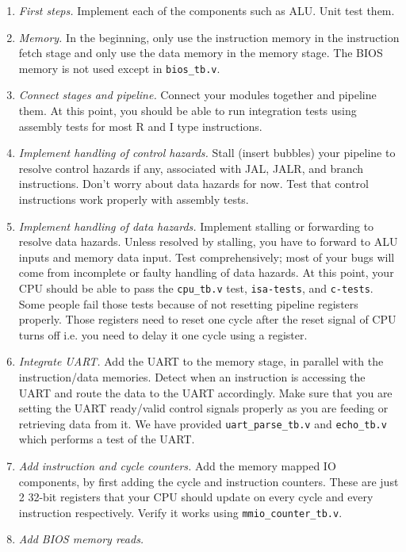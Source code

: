 \begin{enumerate}
\item \textit{First steps.}
  Implement each of the components such as ALU.
  Unit test them.
\item \textit{Memory.}
  In the beginning, only use the instruction memory in the instruction fetch stage and only use the data memory in the memory stage.
  The BIOS memory is not used except in \verb|bios_tb.v|.
\item \textit{Connect stages and pipeline.}
  Connect your modules together and pipeline them.
  At this point, you should be able to run integration tests using assembly tests for most R and I type instructions.
\item \textit{Implement handling of control hazards.}
  Stall (insert bubbles) your pipeline to resolve control hazards if any, associated with JAL, JALR, and branch instructions.
  Don't worry about data hazards for now.
  Test that control instructions work properly with assembly tests.
\item \textit{Implement handling of data hazards.}
  Implement stalling or forwarding to resolve data hazards.
  Unless resolved by stalling, you have to forward to ALU inputs and memory data input.
  Test comprehensively; most of your bugs will come from incomplete or faulty handling of data hazards.
  At this point, your CPU should be able to pass the \verb|cpu_tb.v| test, \verb|isa-tests|, and \verb|c-tests|.
  Some people fail those tests because of not resetting pipeline registers properly.
  Those registers need to reset one cycle after the reset signal of CPU turns off i.e. you need to delay it one cycle using a register.
\item \textit{Integrate UART.}
  Add the UART to the memory stage, in parallel with the  instruction/data memories.
  Detect when an instruction is accessing the UART and route the data to the UART accordingly.
  Make sure that you are setting the UART ready/valid control signals properly
  as you are feeding or retrieving data from it.
  We have provided \verb|uart_parse_tb.v| and \verb|echo_tb.v| which performs a test of the UART.
\item \textit{Add instruction and cycle counters.}
  Add the memory mapped IO components, by first adding the cycle and instruction counters.
  These are just 2 32-bit registers that your CPU should update on every cycle and every instruction respectively.
  Verify it works using \verb|mmio_counter_tb.v|.
\item \textit{Add BIOS memory reads.}

\end{enumerate}
